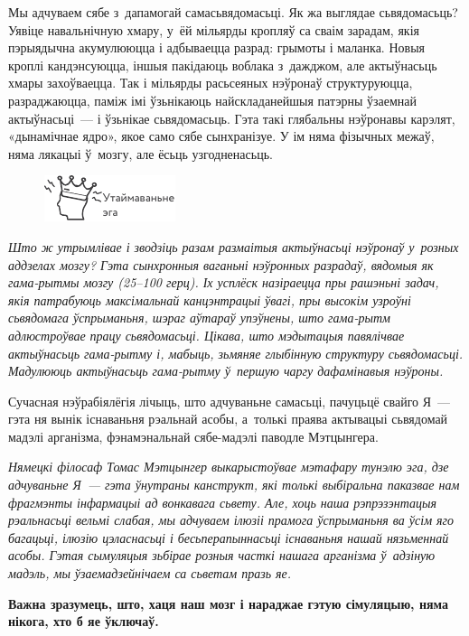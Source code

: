 Мы адчуваем сябе з~дапамогай самасьвядомасьці. Як жа выглядае сьвядомасьць? Уявіце навальнічную хмару, у~ёй мільярды кропляў са сваім зарадам, якія пэрыядычна акумулююцца і адбываецца разрад: грымоты і маланка. Новыя кроплі кандэнсуюцца, іншыя пакідаюць воблака з~дажджом, але актыўнасьць хмары захоўваецца. Так і мільярды расьсеяных нэўронаў структуруюцца, разраджаюцца, паміж імі ўзьнікаюць найскладанейшыя патэрны ўзаемнай актыўнасьці~--- і ўзьнікае сьвядомасьць. Гэта такі глябальны нэўронавы карэлят, «дынамічнае ядро», якое само сябе сынхранізуе. У ім няма фізычных межаў, няма лякацыі ў~мозгу, але ёсьць узгодненасьць.

\begin{figure}[htb!]
  \centering
  \includegraphics[scale=1.5]{willpower/ch8/17.pdf}
\end{figure}

\emph{Што ж утрымлівае і зводзіць разам размаітыя актыўнасьці нэўронаў у~розных аддзелах мозгу? Гэта сынхронныя ваганьні нэўронных разрадаў, вядомыя як гама-рытмы мозгу (25--100 герц). Іх усплёск назіраецца пры рашэньні задач, якія патрабуюць максімальнай канцэнтрацыі ўвагі, пры высокім узроўні сьвядомага ўспрыманьня, шэраг аўтараў упэўнены, што гама-рытм адлюстроўвае працу сьвядомасьці. Цікава, што мэдытацыя павялічвае актыўнасьць гама-рытму і, мабыць, зьмяняе глыбінную структуру сьвядомасьці. Мадулююць актыўнасьць гама-рытму ў~першую чаргу дафамінавыя нэўроны.}

Сучасная нэўрабіялёгія лічыць, што адчуваньне самасьці, пачуцьцё свайго Я~--- гэта ня вынік існаваньня рэальнай асобы, а~толькі праява актывацыі сьвядомай мадэлі арганізма, фэнамэнальнай сябе-мадэлі паводле Мэтцынгера. 

\emph{Нямецкі філосаф Томас Мэтцынгер выкарыстоўвае мэтафару тунэлю эга, дзе адчуваньне Я~--- гэта ўнутраны канструкт, які толькі выбіральна паказвае нам фрагмэнты інфармацыі ад вонкавага сьвету. Але, хоць наша рэпрэзэнтацыя рэальнасьці вельмі слабая, мы адчуваем ілюзіі прамога ўспрыманьня ва ўсім яго багацьці, ілюзію цэласнасьці і бесьперапыннасьці існаваньня нашай нязьменнай асобы. Гэтая сымуляцыя зьбірае розныя часткі нашага арганізма ў~адзіную мадэль, мы ўзаемадзейнічаем са сьветам празь яе.}

\textbf{Важна зразумець, што, хаця наш мозг і нараджае гэтую сімуляцыю, няма нікога, хто б яе ўключаў.}


